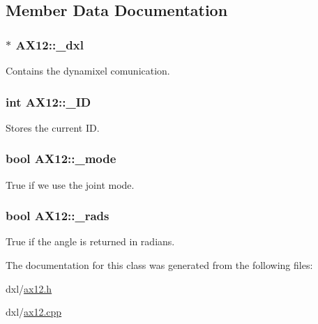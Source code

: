 \subsection{Member Data Documentation}
\hypertarget{a00001_a16df7ccc0a8d3c585a93b6916734bb17}{}
\subsubsection[{\+\_\+dxl}]{$\ast$ A\+X12\+::\+\_\+dxl\hspace{0.3cm}{\ttfamily [private]}}\label{a00001_a16df7ccc0a8d3c585a93b6916734bb17}


Contains the dynamixel comunication. 

\hypertarget{a00001_a0ae2b35fee3d120075e1d8f1e2055804}{}
\subsubsection[{\+\_\+\+I\+D}]{\setlength{\rightskip}{0pt plus 5cm}int A\+X12\+::\+\_\+\+I\+D\hspace{0.3cm}{\ttfamily [private]}}\label{a00001_a0ae2b35fee3d120075e1d8f1e2055804}


Stores the current I\+D. 

\hypertarget{a00001_a2fd07e2e636003227a32d09d211bd6d4}{}
\subsubsection[{\+\_\+mode}]{\setlength{\rightskip}{0pt plus 5cm}bool A\+X12\+::\+\_\+mode\hspace{0.3cm}{\ttfamily [private]}}\label{a00001_a2fd07e2e636003227a32d09d211bd6d4}


True if we use the joint mode. 

\hypertarget{a00001_aba71492043d7a3226f0793db57372bec}{}
\subsubsection[{\+\_\+rads}]{\setlength{\rightskip}{0pt plus 5cm}bool A\+X12\+::\+\_\+rads\hspace{0.3cm}{\ttfamily [private]}}\label{a00001_aba71492043d7a3226f0793db57372bec}


True if the angle is returned in radians. 



The documentation for this class was generated from the following files\+:\begin{DoxyCompactItemize}
\item 
dxl/\hyperlink{a00011}{ax12.\+h}\item 
dxl/\hyperlink{a00010}{ax12.\+cpp}\end{DoxyCompactItemize}

